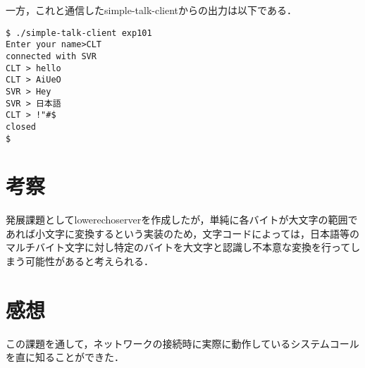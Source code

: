 \documentclass[a4j,10pt,titlepage]{jsarticle}
\begin{document}
	一方，これと通信したsimple-talk-clientからの出力は以下である．
	\begin{verbatim}
$ ./simple-talk-client exp101
Enter your name>CLT
connected with SVR
CLT > hello
CLT > AiUeO
SVR > Hey
SVR > 日本語
CLT > !"#$
closed
$
	\end{verbatim}
	
	\section{考察}
	発展課題としてlowerechoserverを作成したが，単純に各バイトが大文字の範囲であれば小文字に変換するという実装のため，文字コードによっては，日本語等のマルチバイト文字に対し特定のバイトを大文字と認識し不本意な変換を行ってしまう可能性があると考えられる．
	
	\section{感想}
	この課題を通して，ネットワークの接続時に実際に動作しているシステムコールを直に知ることができた．
	
\end{document}
